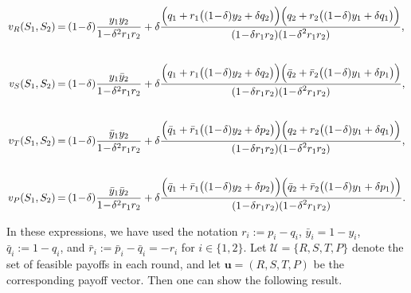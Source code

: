\documentclass[11pt]{article}
\theoremstyle{plainCl1}
\theoremstyle{plainCl2}
\begin{document}
\begin{equation} \label{Eq:LastRound}
\setlength{\arraycolsep}{1pt}
\begin{array}{rcl}

v_{R}(S_1,S_2)	&=	&\displaystyle (1\!-\!\delta)\frac{y_1y_2}{1\!-\!\delta^2 r_1 r_2}+\delta \frac{\Big(q_1+r_1\big((1\!-\!\delta)y_2+\delta q_2\big)\Big) \Big(q_2+r_2\big((1\!-\!\delta)y_1+\delta q_1\big)\Big)}
{\displaystyle(1\!-\!\delta r_1r_2)(1\!-\!\delta^2 r_1 r_2)},\\[1cm]

v_{S}(S_1,S_2)	&=	&\displaystyle (1\!-\!\delta)\frac{y_1\bar{y}_2}{1\!-\!\delta^2 r_1 r_2}+\delta \frac{\Big(q_1+r_1\big((1\!-\!\delta)y_2+\delta q_2\big)\Big) \Big(\bar{q}_2+\bar{r}_2\big((1\!-\!\delta)y_1+\delta p_1\big)\Big)}
{\displaystyle(1\!-\!\delta r_1r_2)(1\!-\!\delta^2 r_1 r_2)},\\[1cm]

v_{T}(S_1,S_2)	&=	&\displaystyle (1\!-\!\delta)\frac{\bar{y}_1y_2}{1\!-\!\delta^2 r_1 r_2}+\delta \frac{\Big(\bar{q}_1+\bar{r}_1\big((1\!-\!\delta)y_2+\delta p_2\big)\Big) \Big(q_2+r_2\big((1\!-\!\delta)y_1+\delta q_1\big)\Big)}
{\displaystyle(1\!-\!\delta r_1r_2)(1\!-\!\delta^2 r_1 r_2)},\\[1cm]

v_{P}(S_1,S_2)	&=	&\displaystyle (1\!-\!\delta)\frac{\bar{y}_1\bar{y}_2}{1\!-\!\delta^2 r_1 r_2}+\delta \frac{\Big(\bar{q}_1+\bar{r}_1\big((1\!-\!\delta)y_2+\delta p_2\big)\Big) \Big(\bar{q}_2+\bar{r}_2\big((1\!-\!\delta)y_1+\delta p_1\big)\Big)}
{\displaystyle(1\!-\!\delta r_1r_2)(1\!-\!\delta^2 r_1 r_2)}.

\end{array}
\end{equation}

In these expressions, we have used the notation $r_i:=p_i\!-\!q_i$, $\bar{y}_i\!=\!1\!-\!y_i$, $\bar{q}_i:=1\!-\!q_i$, and $\bar{r}_i:=\bar{p}_i\!-\!\bar{q}_i=-r_i$ for $i\!\in\!\{1,2\}$. Let $\mathcal{U}=\{R,S,T,P\}$ denote the set of feasible payoffs in each round, and let $\mathbf{u}\!=\!(R,S,T,P)$ be the corresponding payoff vector. Then one can show the following result.
\end{document}
